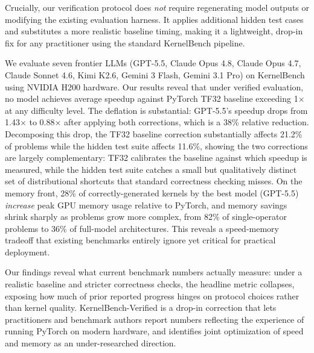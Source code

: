 \documentclass[11pt]{article}
\begin{document}
Crucially, our verification protocol does \emph{not} require regenerating model outputs or modifying the existing evaluation harness. It applies additional hidden test cases and substitutes a more realistic baseline timing, making it a lightweight, drop-in fix for any practitioner using the standard KernelBench pipeline.

We evaluate seven frontier LLMs (GPT-5.5, Claude Opus 4.8, Claude Opus 4.7, Claude Sonnet 4.6, Kimi K2.6, Gemini 3 Flash, Gemini 3.1 Pro) on KernelBench using NVIDIA H200 hardware. Our results reveal that under verified evaluation, no model achieves average speedup against PyTorch TF32 baseline exceeding 1$\times$ at any difficulty level. The deflation is substantial: GPT-5.5's speedup drops from 1.43$\times$ to 0.88$\times$ after applying both corrections, which is a 38\% relative reduction. Decomposing this drop, the TF32 baseline correction substantially affects 21.2\% of problems while the hidden test suite affects 11.6\%, showing the two corrections are largely complementary: TF32 calibrates the baseline against which speedup is measured, while the hidden test suite catches a small but qualitatively distinct set of distributional shortcuts that standard correctness checking misses.
On the memory front, 28\% of correctly-generated kernels by the best model (GPT-5.5) \emph{increase} peak GPU memory usage relative to PyTorch, and memory savings shrink sharply as problems grow more complex, from 82\% of single-operator problems to 36\% of full-model architectures. This reveals a speed-memory tradeoff that existing benchmarks entirely ignore yet critical for practical deployment.

Our findings reveal what current benchmark numbers actually measure: under a realistic baseline and stricter correctness checks, the headline metric collapses, exposing how much of prior reported progress hinges on protocol choices rather than kernel quality. KernelBench-Verified is a drop-in correction that lets practitioners and benchmark authors report numbers reflecting the experience of running PyTorch on modern hardware, and identifies joint optimization of speed and memory as an under-researched direction.


\end{document}
